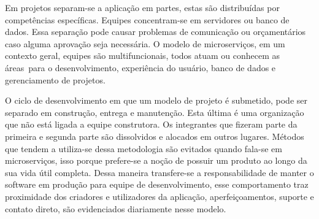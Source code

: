 Em projetos separam-se a aplicação em partes, estas são distribuídas por competências específicas. Equipes concentram-se
em servidores ou banco de dados. Essa separação pode causar problemas de comunicação ou orçamentários caso alguma aprovação
seja necessária. O modelo de microserviços, em um contexto geral, equipes são multifuncionais, todos atuam ou conhecem as
áreas para o desenvolvimento, experiência do usuário, banco de dados e gerenciamento de projetos.


O ciclo de desenvolvimento em que um modelo de projeto é submetido, pode ser separado em construção, entrega e manutenção.
Esta última é uma organização que não está ligada a equipe construtora. Os integrantes que fizeram parte da primeira e
segunda parte são dissolvidos e alocados em outros lugares. Métodos que tendem a utiliza-se dessa metodologia são evitados
quando fala-se em microserviços, isso porque prefere-se a noção de possuir um produto ao longo da sua vida útil completa.
Dessa maneira transfere-se a responsabilidade de manter o software em produção para equipe de desenvolvimento, esse
comportamento traz proximidade dos criadores e utilizadores da aplicação, aperfeiçoamentos, suporte e contato direto, são
evidenciados diariamente nesse modelo.
